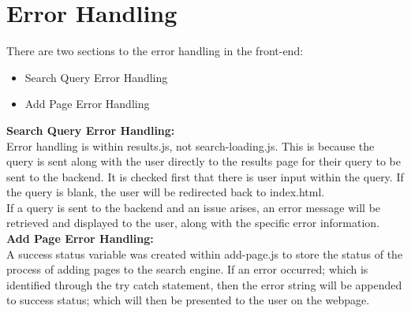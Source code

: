 \section{Error Handling}
There are two sections to the error handling in the front-end:
\begin{itemize}
  \item Search Query Error Handling
  \item Add Page Error Handling
\end{itemize}

\textbf{Search Query Error Handling:}\\
Error handling is within results.js, not search-loading.js. This is because the query is sent along with the user directly to the results page for their query to be sent to the backend. It is checked first that there is user input within the query. If the query is blank, the user will be redirected back to index.html.\\

If a query is sent to the backend and an issue arises, an error message will be retrieved and displayed to the user, along with the specific error information.\\

\textbf{Add Page Error Handling:}\\
A success status variable was created within add-page.js to store the status of the process of adding pages to the search engine. If an error occurred; which is identified through the try catch statement, then the error string will be appended to success status; which will then  be presented to the user on the webpage.\\
